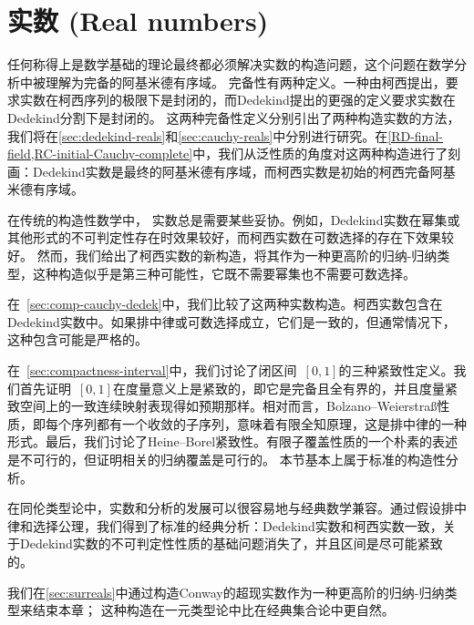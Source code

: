 \chapter{实数 (Real numbers)}
\label{cha:real-numbers}

%
任何称得上是数学基础的理论最终都必须解决实数的构造问题，这个问题在数学分析中被理解为完备的阿基米德有序域。
%
完备性有两种定义。一种由柯西提出，要求实数在柯西序列的极限下是封闭的，而Dedekind提出的更强的定义要求实数在Dedekind分割下是封闭的。
这两种完备性定义分别引出了两种构造实数的方法，我们将在\cref{sec:dedekind-reals}和\cref{sec:cauchy-reals}中分别进行研究。在\cref{RD-final-field,RC-initial-Cauchy-complete}中，我们从泛性质的角度对这两种构造进行了刻画：Dedekind实数是最终的阿基米德有序域，而柯西实数是初始的柯西完备阿基米德有序域。

在传统的构造性数学中，
%
实数总是需要某些妥协。例如，Dedekind实数在幂集或其他形式的不可判定性存在时效果较好，而柯西实数在可数选择的存在下效果较好。
%
然而，我们给出了柯西实数的新构造，将其作为一种更高阶的归纳-归纳类型，这种构造似乎是第三种可能性，它既不需要幂集也不需要可数选择。

在~\cref{sec:comp-cauchy-dedek}中，我们比较了这两种实数构造。柯西实数包含在Dedekind实数中。如果排中律或可数选择成立，它们是一致的，但通常情况下，这种包含可能是严格的。

在~\cref{sec:compactness-interval}中，我们讨论了闭区间~$[0,1]$的三种紧致性定义。我们首先证明~$[0,1]$在度量意义上是紧致的，即它是完备且全有界的，并且度量紧致空间上的一致连续映射表现得如预期那样。相对而言，Bolzano--Weierstra\ss{}性质，即每个序列都有一个收敛的子序列，意味着有限全知原理，这是排中律的一种形式。最后，我们讨论了Heine--Borel紧致性。有限子覆盖性质的一个朴素的表述是不可行的，但证明相关的归纳覆盖是可行的。
本节基本上属于标准的构造性分析。

在同伦类型论中，实数和分析的发展可以很容易地与经典数学兼容。通过假设排中律和选择公理，我们得到了标准的经典分析：Dedekind实数和柯西实数一致，关于Dedekind实数的不可判定性性质的基础问题消失了，并且区间是尽可能紧致的。

我们在\cref{sec:surreals}中通过构造Conway的超现实数作为一种更高阶的归纳-归纳类型来结束本章；
这种构造在一元类型论中比在经典集合论中更自然。


